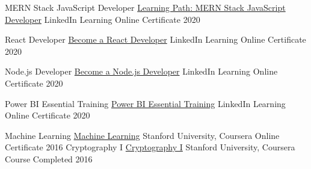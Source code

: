 \begin{cvhonors}
  \cvhonor
    {
    {MERN Stack JavaScript Developer}
    {\href{https://www.linkedin.com/learning/paths/become-a-mern-stack-javascript-developer}
    {Learning Path: MERN Stack JavaScript Developer}}}
    {LinkedIn Learning}
    {
    {Online Certificate}
    {\href{https://mukeshmk.github.io/assets/certificates/LinkedIn\%20Learning\%20-\%20Become\%20a\%20MERN\%20Stack\%20JavaScript\%20Developer.pdf}{}}}
    {2020}
  
  \cvhonor
    {
    {React Developer}
    {\href{https://www.linkedin.com/learning/paths/become-a-react-developer}
    {Become a React Developer}}}
    {LinkedIn Learning}
    {
    {Online Certificate}
    {\href{https://mukeshmk.github.io/assets/certificates/LinkedIn\%20Learning\%20-\%20Become\%20a\%20React\%20Developer.pdf}{}}}
    {2020}

  \cvhonor
    {
    {Node.js Developer}
    {\href{https://www.linkedin.com/learning/paths/become-a-node-js-developer}
    {Become a Node.js Developer}}}
    {LinkedIn Learning}
    {
    {Online Certificate}
    {\href{https://mukeshmk.github.io/assets/certificates/LinkedIn\%20Learning\%20-\%20Learning\%20Path\%20-\%20Become\%20a\%20Node.js\%20Developer.pdf}{}}}
    {2020}

  \cvhonor
    {
    {Power BI Essential Training}
    {\href{https://www.coursera.org/learn/machine-learning}
    {Power BI Essential Training}}}
    {LinkedIn Learning}
    {
    {Online Certificate}
    {\href{https://mukeshmk.github.io/assets/certificates/LinkedIn\%20Learning\%20-\%20Power\%20BI\%20Essential\%20Training\%20-\%20Certificate.pdf}{}}}
    {2020}
    
  \cvhonor
    {
    {Machine Learning}
    {\href{https://www.coursera.org/learn/machine-learning}{Machine Learning}}}
    {Stanford University, Coursera}
    {
    {Online Certificate}
    {\href{https://www.coursera.org/account/accomplishments/verify/ZWCUVR3HSXTM}{}}}
    {2016}
  \cvhonor
    {
    {Cryptography I}
    {\href{https://www.coursera.org/learn/crypto}{Cryptography I}}}
    {Stanford University, Coursera}
    {Course Completed}
    {2016}
\end{cvhonors}
